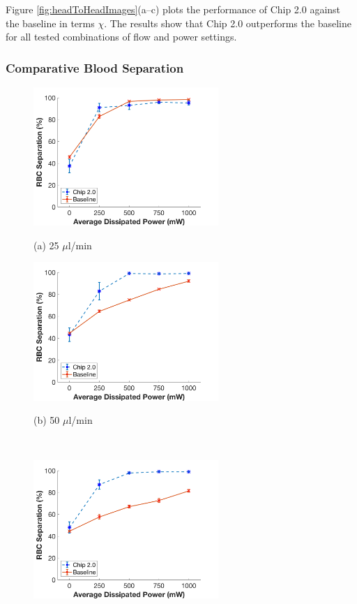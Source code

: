 Figure \ref{fig:headToHeadImages}(a--c) plots the performance of Chip 2.0 against the baseline in terms $\chi$. The results show that Chip 2.0 outperforms the baseline for all tested combinations of flow and power settings.
\subsubsection{Comparative Blood Separation}
\label{sssec:comparisonBlood}

\begin{figure}[H]
  \begin{minipage}[t]{0.49\linewidth}\centering
    \includegraphics[width=7cm]{ErrorBarBloodData25ul}
    \medskip
    \centerline{(a) 25 $\mu$l/min}
  \end{minipage}\hfill
  \begin{minipage}[t]{0.49\linewidth}\centering
    \includegraphics[width=7cm]{ErrorBarBloodData50ul}
    \medskip
    \centerline{(b) 50 $\mu$l/min}\\
  \end{minipage}
  \begin{minipage}[t]{0.99\linewidth}\centering
    \includegraphics[width=7cm]{ErrorBarBloodData75ul}

\end{minipage}
\end{figure}
